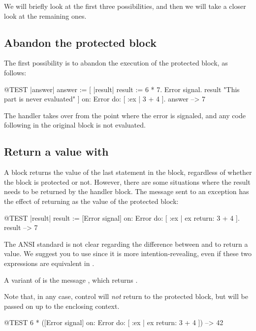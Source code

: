 \documentclass[a4paper,10pt,twoside]{book}
\begin{document}
We will briefly look at the first three possibilities, and then we will take a closer look at the remaining ones.

\subsection{Abandon the protected block}

The first possibility is to abandon the execution of the protected block, as follows:
\begin{code}{@TEST |answer|}
answer := [ |result|
	result := 6 * 7.
	Error signal.
	result 	"This part is never evaluated"
]	on: Error
	do: [ :ex | 3 + 4 ].
answer --> 7
\end{code}

The handler takes over from the point where the error is signaled, and any code following in the original block is not evaluated.

\subsection{Return a value with }
A block returns the value of the last statement in the block, regardless of whether the block is protected or not. However, there are some situations where the result needs to be returned by the handler block. The message  sent to an exception has the effect of returning  as the value of the protected block:

\begin{code}{@TEST |result|}
result := [Error signal]
	on: Error
	do: [ :ex | ex return: 3 + 4 ].
result --> 7
\end{code}

The ANSI standard is not clear regarding the difference between  and  to return a value. We suggest you to use  since it is more intention-revealing, even if these two expressions are equivalent in \pharo.

A variant of  is the message , which returns . 

Note that, in any case, control will \emph{not} return to the protected block, but will be passed on up to the enclosing context.

\begin{code}{@TEST}
6 * ([Error signal] on: Error do: [ :ex | ex return: 3 + 4 ]) --> 42
\end{code}
\end{document}
